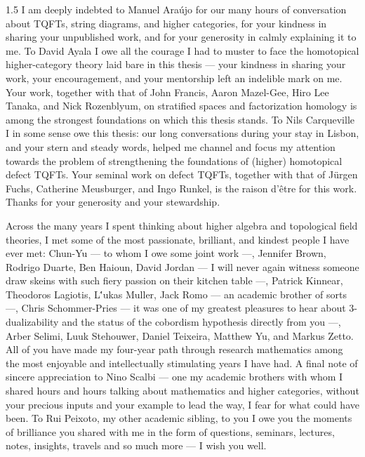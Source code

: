\documentclass{amsbook}
\begin{document}
\begin{spacing}{1.5}
I am deeply indebted to Manuel Araújo for our many hours of conversation about TQFTs, string diagrams, and higher categories, for your kindness in sharing your unpublished work, and for your generosity in calmly explaining it to me. To David Ayala I owe all the courage I had to muster to face the homotopical higher-category theory laid bare in this thesis — your kindness in sharing your work, your encouragement, and your mentorship left an indelible mark on me. Your work, together with that of John Francis, Aaron Mazel-Gee, Hiro Lee Tanaka, and Nick Rozenblyum, on stratified spaces and factorization homology is among the strongest foundations on which this thesis stands. To Nils Carqueville I in some sense owe this thesis: our long conversations during your stay in Lisbon, and your stern and steady words, helped me channel and focus my attention towards the problem of strengthening the foundations of (higher) homotopical defect TQFTs. Your seminal work on defect TQFTs, together with that of Jürgen Fuchs, Catherine Meusburger, and Ingo Runkel, is the raison d'être for this work. Thanks for your generosity and your stewardship. 

Across the many years I spent thinking about higher algebra and topological field theories, I met some of the most passionate, brilliant, and kindest people I have ever met: Chun-Yu — to whom I owe some joint work —, Jennifer Brown, Rodrigo Duarte, Ben Haioun, David Jordan — I will never again witness someone draw skeins with such fiery passion on their kitchen table —, Patrick Kinnear, Theodoros Lagiotis, L\''ukas Muller, Jack Romo — an academic brother of sorts —, Chris Schommer-Pries — it was one of my greatest pleasures to hear about 3-dualizability and the status of the cobordism hypothesis directly from you —, Arber Selimi, Luuk Stehouwer, Daniel Teixeira, Matthew Yu, and Markus Zetto. All of you have made my four-year path through research mathematics among the most enjoyable and intellectually stimulating years I have had. A final note of sincere appreciation to Nino Scalbi — one my academic brothers with whom I shared hours and hours talking about mathematics and higher categories, without your precious inputs and your example to lead the way, I fear for what could have been. To Rui Peixoto, my other academic sibling, to you I owe you the moments of brilliance you shared with me in the form of questions, seminars, lectures, notes, insights, travels and so much more — I wish you well.


\end{spacing}
\end{document}
